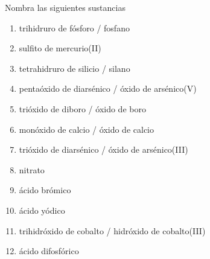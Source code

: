 \documentclass[10pt,a5paper,twoside]{article}
\begin{document}
\begin{exercise}[
    tags    = {inorgánica,nomenclatura,múltiple,2B},
    topics  = {química inorgánica,formulación,nomenclatura},
    source  = {Química 2B SAN 2016, p372, e8},
  ]
  Nombra las siguientes sustancias

  \begin{enumerate}\begin{multicols}{2}
    \item {}
    \item {}
    \item {}
    \item {}
    \item {}
    \item {}
    \item {}
    \item {}
    \item {}
    \item {}
    \item {}
    \item {}
  \end{multicols}\end{enumerate}
\end{exercise}

\begin{solution}
  \begin{enumerate}
    \item trihidruro de fósforo / fosfano
    \item sulfito de mercurio(II)
    \item tetrahidruro de silicio / silano
    \item pentaóxido de diarsénico / óxido de arsénico(V)
    \item trióxido de diboro / óxido de boro
    \item monóxido de calcio / óxido de calcio
    \item trióxido de diarsénico / óxido de arsénico(III)
    \item nitrato
    \item ácido brómico
    \item ácido yódico
    \item trihidróxido de cobalto / hidróxido de cobalto(III)
    \item ácido difosfórico
  \end{enumerate}
\end{solution}
\end{document}
